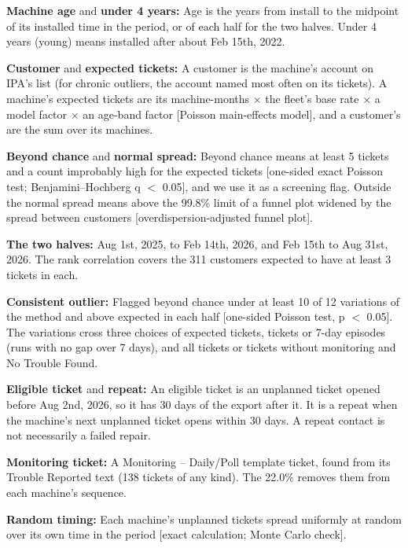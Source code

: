 \begin{ipadefs}
\item \textbf{Machine age} and \textbf{under 4 years:} Age is the years from install to the midpoint of its installed time in the period, or of each half for the two halves. Under 4 years (young) means installed after about Feb 15th, 2022.
\item \textbf{Customer} and \textbf{expected tickets:} A customer is the machine's account on IPA's list (for chronic outliers, the account named most often on its tickets). A machine's expected tickets are its machine-months $\times$ the fleet's base rate $\times$ a model factor $\times$ an age-band factor [Poisson main-effects model], and a customer's are the sum over its machines.
\item \textbf{Beyond chance} and \textbf{normal spread:} Beyond chance means at least 5 tickets and a count improbably high for the expected tickets [one-sided exact Poisson test; Benjamini--Hochberg q $<$ 0.05], and we use it as a screening flag. Outside the normal spread means above the 99.8\% limit of a funnel plot widened by the spread between customers [overdispersion-adjusted funnel plot].
\item \textbf{The two halves:} Aug 1st, 2025, to Feb 14th, 2026, and Feb 15th to Aug 31st, 2026. The rank correlation covers the 311 customers expected to have at least 3 tickets in each.
\item \textbf{Consistent outlier:} Flagged beyond chance under at least 10 of 12 variations of the method and above expected in each half [one-sided Poisson test, p $<$ 0.05]. The variations cross three choices of expected tickets, tickets or 7-day episodes (runs with no gap over 7 days), and all tickets or tickets without monitoring and No Trouble Found.
\item \textbf{Eligible ticket} and \textbf{repeat:} An eligible ticket is an unplanned ticket opened before Aug 2nd, 2026, so it has 30 days of the export after it. It is a repeat when the machine's next unplanned ticket opens within 30 days. A repeat contact is not necessarily a failed repair.
\item \textbf{Monitoring ticket:} A Monitoring -- Daily/Poll template ticket, found from its Trouble Reported text (138 tickets of any kind). The 22.0\% removes them from each machine's sequence.
\item \textbf{Random timing:} Each machine's unplanned tickets spread uniformly at random over its own time in the period [exact calculation; Monte Carlo check].
\end{ipadefs}


